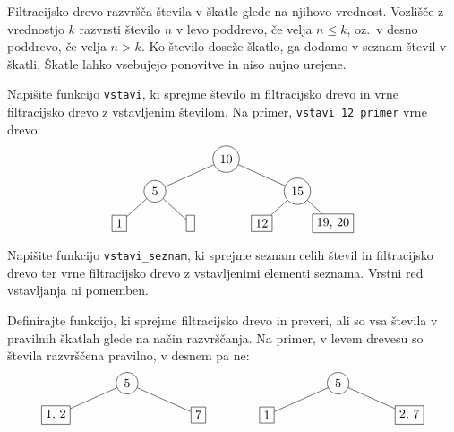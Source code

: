 \documentclass[arhiv]{../izpit}
\begin{document}
\podnaloga
  Filtracijsko drevo razvršča števila v škatle glede na njihovo vrednost.
  Vozlišče z vrednostjo $k$ razvrsti število $n$ v levo poddrevo, če velja
  $n \leq k$, oz.\ v desno poddrevo, če velja $n > k$.
  Ko število doseže škatlo, ga dodamo v seznam števil v škatli.
  Škatle lahko vsebujejo ponovitve in niso nujno urejene.

  Napišite funkcijo \verb|vstavi|, ki sprejme število in filtracijsko drevo in
  vrne filtracijsko drevo z vstavljenim številom.
  Na primer, \verb|vstavi 12 primer| vrne drevo:
  \[
    \begin{tikzpicture}[level distance=0.9cm,
      level 1/.style={sibling distance=4cm},
      level 2/.style={sibling distance=2cm},
      level 3/.style={sibling distance=2cm}
      ]
      \node[circle, draw] {10}
        child {node[circle, draw] {5}
          child {node[rectangle, draw] {1}}
          child {node[rectangle, draw] {\vphantom{1}}}
        }
        child {node[circle, draw] {15}
          child {node[rectangle, draw] {12}}
          child {node[rectangle, draw] {19, 20}}
        };
    \end{tikzpicture}
  \]

\podnaloga
  Napišite funkcijo \verb|vstavi_seznam|, ki sprejme seznam celih števil in
  filtracijsko drevo ter vrne filtracijsko drevo z vstavljenimi elementi seznama.
  Vrstni red vstavljanja ni pomemben.

\podnaloga
  Definirajte funkcijo, ki sprejme filtracijsko drevo in preveri, ali
  so vsa števila v pravilnih škatlah glede na način razvrščanja.
  Na primer, v levem drevesu so števila razvrščena pravilno, v desnem pa ne:
  \[
    \begin{tikzpicture}[level distance=0.9cm,
      level 1/.style={sibling distance=4cm},
      level 2/.style={sibling distance=2cm}
      ]
      \node[circle, draw] {5}
        child {node[rectangle, draw] {1, 2}}
        child {node[rectangle, draw] {7}};
    \end{tikzpicture}
    \hspace{15mm}
    \begin{tikzpicture}[level distance=0.9cm,
      level 1/.style={sibling distance=4cm},
      level 2/.style={sibling distance=2cm}
      ]
      \node[circle, draw] {5}
        child {node[rectangle, draw] {1}}
        child {node[rectangle, draw] {2, 7}};
    \end{tikzpicture}
  \]
\end{document}
